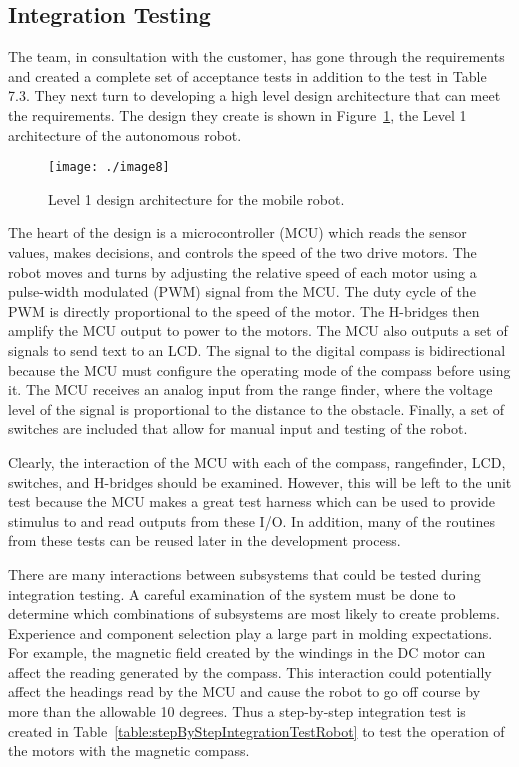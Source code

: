 \subsection*{Integration Testing}
\label{subsection:integration-testing-1}

The team, in consultation with the customer, has gone through the
requirements and created a complete set of acceptance tests in addition
to the test in Table 7.3. They next turn to developing a high level
design architecture that can meet the requirements. The design they
create is shown in 
Figure~\ref{figure:level1mobileRobot}, the Level 1 architecture of the
autonomous robot.


\begin{figure}
\texttt{[image: ./image8]}
\caption{Level 1 design architecture for the mobile robot.}
\label{figure:level1mobileRobot}
\end{figure}

The heart of the design is a microcontroller (MCU) which reads the
sensor values, makes decisions, and controls the speed of the two drive
motors. The robot moves and turns by adjusting the relative speed of
each motor using a pulse-width modulated (PWM) signal from the MCU. The
duty cycle of the PWM is directly proportional to the speed of the
motor. The H-bridges then amplify the MCU output to power to the motors.
The MCU also outputs a set of signals to send text to an LCD. The signal
to the digital compass is bidirectional because the MCU must configure
the operating mode of the compass before using it. The MCU receives an
analog input from the range finder, where the voltage level of the
signal is proportional to the distance to the obstacle. Finally, a set
of switches are included that allow for manual input and testing of the
robot.

Clearly, the interaction of the MCU with each of the compass,
rangefinder, LCD, switches, and H-bridges should be examined. However,
this will be left to the unit test because the MCU makes a great test
harness which can be used to provide stimulus to and read outputs from
these I/O. In addition, many of the routines from these tests can be
reused later in the development process.

There are many interactions between subsystems that could be tested
during integration testing. A careful examination of the system must be
done to determine which combinations of subsystems are most likely to
create problems. Experience and component selection play a large part in
molding expectations. For example, the magnetic field created by the
windings in the DC motor can affect the reading generated by the
compass. This interaction could potentially affect the headings read by
the MCU and cause the robot to go off course by more than the allowable
10 degrees. Thus a step-by-step integration test is created in 
Table~\ref{table:stepByStepIntegrationTestRobot}
to test the operation of the motors with the magnetic compass.


